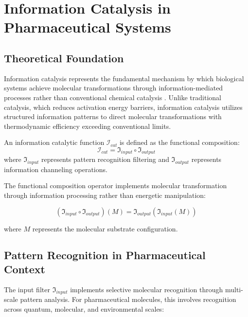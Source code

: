 \section{Information Catalysis in Pharmaceutical Systems}

\subsection{Theoretical Foundation}

Information catalysis represents the fundamental mechanism by which biological systems achieve molecular transformations through information-mediated processes rather than conventional chemical catalysis \citep{landauer1961irreversibility, bennett1982thermodynamics}. Unlike traditional catalysis, which reduces activation energy barriers, information catalysis utilizes structured information patterns to direct molecular transformations with thermodynamic efficiency exceeding conventional limits.

\begin{definition}
An information catalytic function $\mathcal{I}_{cat}$ is defined as the functional composition:
\begin{equation}
\mathcal{I}_{cat} = \mathfrak{I}_{input} \circ \mathfrak{I}_{output}
\end{equation}
where $\mathfrak{I}_{input}$ represents pattern recognition filtering and $\mathfrak{I}_{output}$ represents information channeling operations.
\end{definition}

The functional composition operator implements molecular transformation through information processing rather than energetic manipulation:

\begin{equation}
(\mathfrak{I}_{input} \circ \mathfrak{I}_{output})(M) = \mathfrak{I}_{output}(\mathfrak{I}_{input}(M))
\end{equation}

where $M$ represents the molecular substrate configuration.

\subsection{Pattern Recognition in Pharmaceutical Context}

The input filter $\mathfrak{I}_{input}$ implements selective molecular recognition through multi-scale pattern analysis. For pharmaceutical molecules, this involves recognition across quantum, molecular, and environmental scales:


